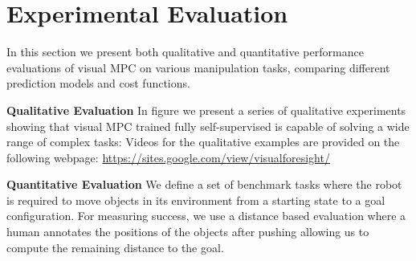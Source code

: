 \section{Experimental Evaluation}
\label{sec:experiments}
In this section we present both qualitative and quantitative  performance evaluations of visual MPC on various manipulation tasks, comparing different prediction models and cost functions.



\noindent \textbf{Qualitative Evaluation}
In figure  we present a series of qualitative experiments showing that visual MPC trained fully self-supervised is capable of solving a wide range of complex tasks:
Videos for the qualitative examples are provided on the following webpage: \url{https://sites.google.com/view/visualforesight/}

\noindent \textbf{Quantitative Evaluation} We define a set of benchmark tasks where the robot is required to move objects in its environment from a starting state to a goal configuration. For measuring success, we use a distance based evaluation where a human annotates the positions of the objects after pushing allowing us to compute the remaining distance to the goal.

